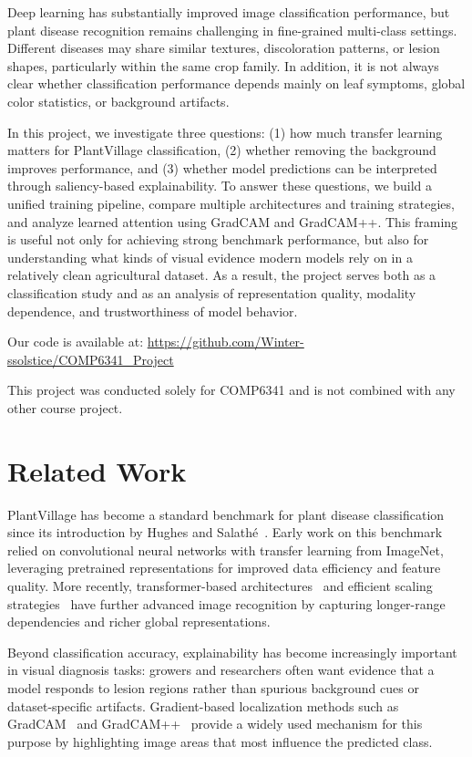 \documentclass[10pt,twocolumn,letterpaper]{article}
\begin{document}
Deep learning has substantially improved image classification performance, but plant disease recognition remains challenging in fine-grained multi-class settings. Different diseases may share similar textures, discoloration patterns, or lesion shapes, particularly within the same crop family. In addition, it is not always clear whether classification performance depends mainly on leaf symptoms, global color statistics, or background artifacts.

In this project, we investigate three questions: (1) how much transfer learning matters for PlantVillage classification, (2) whether removing the background improves performance, and (3) whether model predictions can be interpreted through saliency-based explainability. To answer these questions, we build a unified training pipeline, compare multiple architectures and training strategies, and analyze learned attention using GradCAM and GradCAM++. This framing is useful not only for achieving strong benchmark performance, but also for understanding what kinds of visual evidence modern models rely on in a relatively clean agricultural dataset. As a result, the project serves both as a classification study and as an analysis of representation quality, modality dependence, and trustworthiness of model behavior.

Our code is available at:
\url{https://github.com/Winter-ssolstice/COMP6341_Project}

This project was conducted solely for COMP6341 and is not combined with any other course project.

\section{Related Work}

PlantVillage has become a standard benchmark for plant disease classification since its introduction by Hughes and Salath\'e~\cite{hughes2015open}. Early work on this benchmark relied on convolutional neural networks with transfer learning from ImageNet, leveraging pretrained representations for improved data efficiency and feature quality. More recently, transformer-based architectures~\cite{dosovitskiy2021vit} and efficient scaling strategies~\cite{tan2019efficientnet,he2016resnet} have further advanced image recognition by capturing longer-range dependencies and richer global representations.

Beyond classification accuracy, explainability has become increasingly important in visual diagnosis tasks: growers and researchers often want evidence that a model responds to lesion regions rather than spurious background cues or dataset-specific artifacts. Gradient-based localization methods such as GradCAM~\cite{selvaraju2017grad} and GradCAM++~\cite{chattopadhay2018gradcampp} provide a widely used mechanism for this purpose by highlighting image areas that most influence the predicted class.
\end{document}
